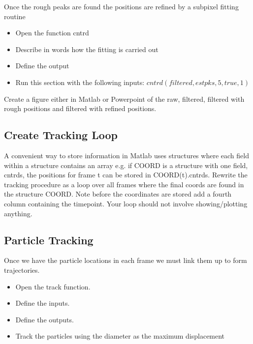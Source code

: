 \documentclass[12pt,a4paper,twoside]{article}
\begin{document}
 Once the rough peaks are found the positions are refined by a subpixel fitting routine

\begin{itemize}
    \item Open the function cntrd
    \item Describe in words how the fitting is carried out
        \vspace{1cm}
    \item Define the output
        \vspace{1cm}
     \item Run this section with the following inputs: $cntrd(filtered,estpks,5,true,1)$
        \vspace{1cm}   
\end{itemize}


Create a figure either in Matlab or Powerpoint of the raw, filtered, filtered with rough positions and filtered with refined positions.

\subsection{Create Tracking Loop}
A convenient way to store information in Matlab uses structures where each field within a structure contains an array e.g. if COORD is a structure with one field, cntrds, the positions for frame t can be stored in COORD(t).cntrds.
Rewrite the tracking procedure as a loop over all frames where the final coords are found in the structure COORD.
Note before the coordinates are stored add a fourth column containing the timepoint. Your loop should not involve showing/plotting anything.

\subsection{Particle Tracking}

Once we have the particle locations in each frame we must link them up to form trajectories. 

\begin{itemize}
    \item Open the track function.
    \item Define the inputs.
    \vspace{1cm}
    \item Define the outputs.
        \vspace{1cm}
    \item Track the particles using the diameter as the maximum displacement
\end{itemize}
\end{document}
